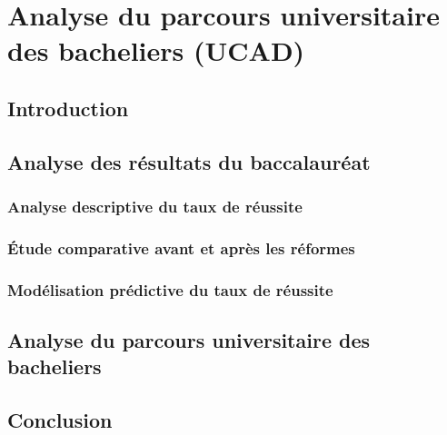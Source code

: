 \chapter{Analyse du parcours universitaire des bacheliers (UCAD)}

\section{Introduction}

\section{Analyse des résultats du baccalauréat}

\subsection{Analyse descriptive du taux de réussite}



\subsection{Étude comparative avant et après les réformes}



\subsection{Modélisation prédictive du taux de réussite}







\section{Analyse du parcours universitaire des bacheliers}

\section{Conclusion}